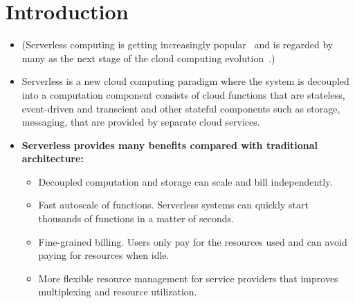 \section{Introduction}

\begin{itemize}

  \item (Serverless computing is getting increasingly
  popular~\cite{datadog-state-of-serverless} and is regarded by many as the
  next stage of the cloud computing evolution~\cite{berkeley}.)

  \item Serverless is a new cloud computing paradigm where the system is
  decoupled into a computation component consists of cloud functions that are
  stateless, event-driven and transcient and other stateful components such as
  storage, messaging, that are provided by separate cloud services.

  \item \textbf{Serverless provides many benefits compared with traditional
  architecture: }

    \begin{itemize}

      \item Decoupled computation and storage can scale and bill
      independently.



      \item Fast autoscale of functions. Serverless systems can quickly start
      thousands of functions in a matter of seconds.


      \item Fine-grained billing. Users only pay for the resources used and
      can avoid paying for resources when idle.

      \item More flexible resource management for service providers that
      improves multiplexing and resource utilization.


\end{itemize}
\end{itemize}
